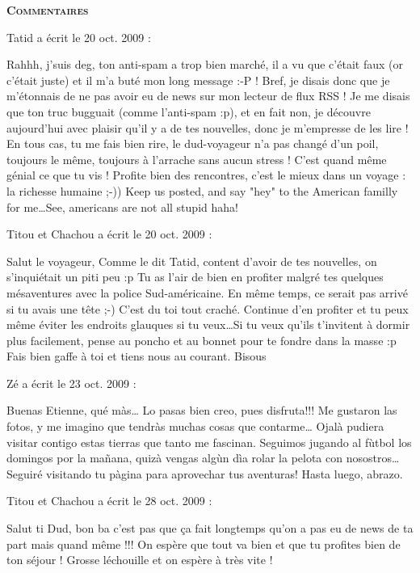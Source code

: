 \bigskip
\textbf{\textsc{Commentaires}}

\medskip
Tatid a écrit le 20 oct. 2009 :
\begin{displayquote}
Rahhh, j'suis deg, ton anti-spam a trop bien marché, il a vu que c'était faux (or c'était juste) et il m'a buté mon long message :-P !
Bref, je disais donc que je m'étonnais de ne pas avoir eu de news sur mon lecteur de flux RSS ! Je me disais que ton truc bugguait (comme l'anti-spam :p), et en fait non, je découvre aujourd'hui avec plaisir qu'il y a de tes nouvelles, donc je m'empresse de les lire !
En tous cas, tu me fais bien rire, le dud-voyageur n'a pas changé d'un poil, toujours le même, toujours à l'arrache sans aucun stress ! C'est quand même génial ce que tu vis ! Profite bien des rencontres, c'est le mieux dans un voyage : la richesse humaine ;-))
Keep us posted, and say "hey" to the American familly for me\dots See, americans are not all stupid haha!
\end{displayquote}

\medskip
Titou et Chachou a écrit le 20 oct. 2009 :
\begin{displayquote}
Salut le voyageur,
Comme le dit Tatid, content d'avoir de tes nouvelles, on s'inquiétait un piti peu :p
Tu as l'air de bien en profiter malgré tes quelques mésaventures avec la police Sud-américaine. En même temps, ce serait pas arrivé si tu avais une tête ;-) C'est du toi tout craché.
Continue d'en profiter et tu peux même éviter les endroits glauques si tu veux\dots Si tu veux qu'ils t'invitent à dormir plus facilement, pense au poncho et au bonnet pour te fondre dans la masse :p
Fais bien gaffe à toi et tiens nous au courant.
Bisous
\end{displayquote}

\medskip
Zé a écrit le 23 oct. 2009 :
\begin{displayquote}
Buenas Etienne, qué màs\dots
Lo pasas bien creo, pues disfruta!!!
Me gustaron las fotos, y me imagino que tendràs muchas cosas que contarme\dots
Ojalà pudiera visitar contigo estas tierras que tanto me fascinan.
Seguimos jugando al fùtbol los domingos por la mañana, quizà vengas algùn dìa rolar la pelota con nosostros\dots
Seguiré visitando tu pàgina para aprovechar tus aventuras!
Hasta luego, abrazo.
\end{displayquote}

\medskip
Titou et Chachou a écrit le 28 oct. 2009 :
\begin{displayquote}
Salut ti Dud,
bon ba c'est pas que ça fait longtemps qu'on a pas eu de news de ta part mais quand même !!! On espère que tout va bien et que tu profites bien de ton séjour !
Grosse léchouille et on espère à très vite !
\end{displayquote}

